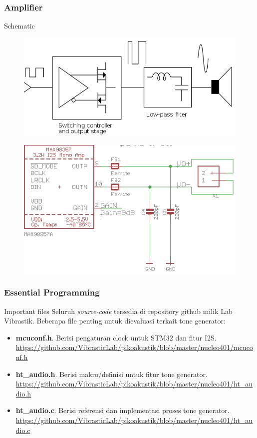 \documentclass[table,dvipsnames,10pt]{beamer}
\begin{document}
	\begin{frame}
	\frametitle{Amplifier}
	\begin{exampleblock}{Schematic} 
		\begin{figure}[H]
			\centering
			\includegraphics[width=0.6\linewidth]{images/classD}
		\end{figure}
	\end{exampleblock}
	\begin{exampleblock}{} 
		\begin{figure}[H]
			\centering
			\includegraphics[width=0.45\linewidth]{images/max98357A}
		\end{figure}
	\end{exampleblock}
	\end{frame}

	\begin{frame}
	\frametitle{Essential Programming}
	\begin{exampleblock}{Important files} 
		Seluruh \textit{source-code} tersedia di repository github milik Lab Vibrastik.
		Beberapa file penting untuk dievaluasi terkait tone generator:
		
		\begin{itemize}
			\item \textbf{mcuconf.h}. Berisi pengaturan clock untuk STM32 dan fitur I2S.\\
			\url{https://github.com/VibrasticLab/pikoakustik/blob/master/nucleo401/mcuconf.h}
			
			\item \textbf{ht\_audio.h}. Berisi makro/definisi untuk fitur tone generator.\\
			\url{https://github.com/VibrasticLab/pikoakustik/blob/master/nucleo401/ht_audio.h}
			
			\item \textbf{ht\_audio.c}. Berisi referensi dan implementasi proses tone generator.\\
			\url{https://github.com/VibrasticLab/pikoakustik/blob/master/nucleo401/ht_audio.c}
		\end{itemize}
	\end{exampleblock}
	\end{frame}
\end{document}
